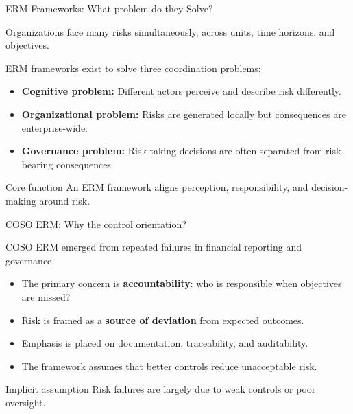 \documentclass[aspectratio=169, 10pt]{beamer} %
\begin{document}
\begin{frame}{ERM Frameworks: What problem do they Solve?}

Organizations face many risks simultaneously, across units, time horizons,
and objectives.

\medskip

ERM frameworks exist to solve three coordination problems:

\begin{itemize}
    \item \textbf{Cognitive problem:} Different actors perceive and describe
    risk differently.
    
    \item \textbf{Organizational problem:} Risks are generated locally but
    consequences are enterprise-wide.
    
    \item \textbf{Governance problem:} Risk-taking decisions are often separated
    from risk-bearing consequences.
\end{itemize}

\begin{block}{Core function}
An ERM framework aligns perception, responsibility, and decision-making
around risk.
\end{block}

\end{frame}
\begin{frame}{COSO ERM: Why the control orientation?}

COSO ERM emerged from repeated failures in financial reporting and governance.

\medskip

\begin{itemize}
    \item The primary concern is \textbf{accountability}: who is responsible
    when objectives are missed?
    
    \item Risk is framed as a \textbf{source of deviation} from expected outcomes.
    
    \item Emphasis is placed on documentation, traceability, and auditability.
    
    \item The framework assumes that better controls reduce unacceptable risk.
\end{itemize}

\begin{block}{Implicit assumption}
Risk failures are largely due to weak controls or poor oversight.
\end{block}

\end{frame}
\end{document}
